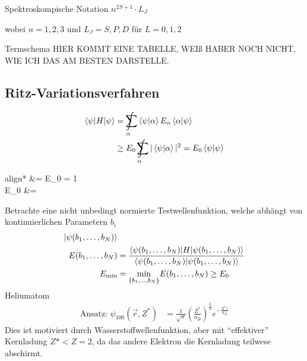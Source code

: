 Spektroskompische Notation $n^{2 S + 1} \cdot L_J$

wobei $n=1,2,3$ und $L_J = S, P, D$ für $L=0, 1, 2$

Termschema
HIER KOMMT EINE TABELLE, WEIß HABER NOCH NICHT, WIE ICH DAS AM BESTEN DARSTELLE. 

\subsection{Ritz-Variationsverfahren}
	\begin{align*}	
	\braket{\psi | H | \psi} &= \int \limits_\alpha\!\!\!\!\!\!\!\!\!\;\sum
	\braket{\psi | \alpha} E_\alpha \braket{\alpha | \psi} \\
	&\geq E_0 \int \limits_\alpha\!\!\!\!\!\!\!\!\!\;\sum |\braket{\psi | \alpha}|^2 
	= E_0 \braket{\psi | \psi}
	\end{align*}
	\begin{empheq}[box=\boxed]{align*}
		\Rightarrow {} &= E_0  \braket{\psi | \psi} = 1 \\
		 E_0 &=  
	\end{empheq}
Betrachte eine nicht unbedingt normierte Testwellenfunktion, welche abhängt von kontinuierlichen Parametern $b_i$
	\begin{align*}
		\ket{\psi (b_1, \ldots, b_N)}& \\
		E(b_1, \ldots, b_N) &= 
		\frac{\braket{\psi (b_1, \ldots, b_N)|H|\psi (b_1, \ldots, b_N)}}{\braket{\psi (b_1, \ldots, b_N)|\psi (b_1, \ldots, b_N)}} \\
		E_{\text{min}} &= \underset{\{b_1, \ldots, b_N\}}{\mathrm{min}}
		E(b_1, \ldots, b_N) \geq E_0
	\end{align*}
Heliumatom
	\begin{align*}
		\text{Ansatz: } \psi_{100}(\vec{r}, Z^*)
		&= \frac{1}{\sqrt{\pi}} \left(\frac{Z^*}{a_B}\right)^{\frac{3}{2}} e^{-\frac{Z^* r}{a_B}}
	\end{align*}
Dies ist motiviert durch Wasserstoffwellenfunktion, aber mit ``effektiver'' Kernladung 
$Z* < Z = 2$, da das andere Elektron die Kernladung teilwese abschirmt.
	